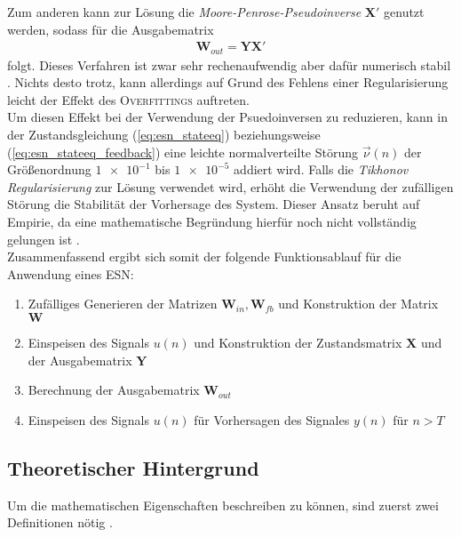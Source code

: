 Zum anderen kann zur Lösung die \textit{Moore-Penrose-Pseudoinverse} $\mathbf{X}'$ genutzt werden, sodass für die Ausgabematrix
\begin{align}
\label{eq:pseudo_inverse}
\mathbf{W}_{out} = \mathbf{Y} \mathbf{X}'
\end{align}
folgt. Dieses Verfahren ist zwar sehr rechenaufwendig aber dafür numerisch stabil \cite{lukoseviciusa2009, jaeger2012}. Nichts desto trotz, kann allerdings auf Grund des Fehlens einer Regularisierung leicht der Effekt des \textsc{Overfittings} auftreten.\\
Um diesen Effekt bei der Verwendung der Psuedoinversen zu reduzieren, kann in der Zustandsgleichung (\ref{eq:esn_stateeq}) beziehungsweise (\ref{eq:esn_stateeq_feedback}) eine leichte normalverteilte Störung $\vec{\nu}(n)$ der Größenordnung $\num{1e-1}$ bis $\num{1e-5}$ addiert wird. Falls die \textit{Tikhonov Regularisierung} zur Lösung verwendet wird, erhöht die Verwendung der zufälligen Störung die Stabilität der Vorhersage des System. Dieser Ansatz beruht auf Empirie, da eine mathematische Begründung hierfür noch nicht vollständig gelungen ist \citep{jaeger2010, lukoseviciusa2009}.\\

Zusammenfassend ergibt sich somit der folgende Funktionsablauf für die Anwendung eines \textsc{ESN}:

\singlespacing
\begin{enumerate}
	\item Zufälliges Generieren der Matrizen $\mathbf{W}_{in}, \mathbf{W}_{fb}$ und Konstruktion der Matrix $\mathbf{W}$ 
	\item Einspeisen des Signals $u(n)$ und Konstruktion der Zustandsmatrix $\mathbf{X}$ und der Ausgabematrix $\mathbf{Y}$ 
	\item Berechnung der Ausgabematrix $\mathbf{W}_{out}$
	\item Einspeisen des Signals $u(n)$ für Vorhersagen des Signales $y(n)$ für $n > T$
\end{enumerate}
\onehalfspacing







\subsection{Theoretischer Hintergrund}
\label{sc:esn_theory}
Um die mathematischen Eigenschaften beschreiben zu können, sind zuerst zwei Definitionen nötig \cite{yildiz}.

